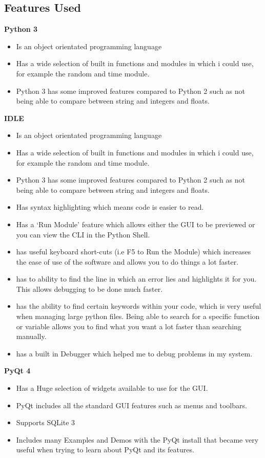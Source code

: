 \subsection{Features Used}

\textbf{Python 3}
\begin{itemize}
	\item Is an object orientated programming language
	\item Has a wide selection of built in functions and modules in which i could use, for example the random and time module.
	\item Python 3 has some improved features compared to Python 2 such as not being able to compare between string and integers and floats.
\end{itemize}
\vspace{5mm}


\textbf{IDLE}
\begin{itemize}
	\item Is an object orientated programming language
	\item Has a wide selection of built in functions and modules in which i could use, for example the random and time module.
	\item Python 3 has some improved features compared to Python 2 such as not being able to compare between string and integers and floats.
	\item Has syntax highlighting which means code is easier to read.
	\item Has a `Run Module' feature which allows either the GUI to be previewed or you can view the CLI in the Python Shell.
	\item has useful keyboard short-cuts (i.e F5 to Run the Module) which increases the ease of use of the software and allows you to do things a lot faster.
	\item has to ability to find the line in which an error lies and highlights it for you. This allows debugging to be done much faster.
	\item has the ability to find certain keywords within your code, which is very useful when managing large python files. Being able to search for a specific function or variable allows you to find what you want a lot faster than searching manually.
	\item has a built in Debugger which helped me to debug problems in my system.
\end{itemize}
\vspace{5mm}

\textbf{PyQt 4}
\begin{itemize}
	\item Has a Huge selection of widgets available to use for the GUI.
	\item PyQt includes all the standard GUI features such as menus and toolbars.
	\item Supports SQLite 3
	\item Includes many Examples and Demos with the PyQt install that became very useful when trying to learn about PyQt and its features.
\end{itemize}
\vspace{5mm}

